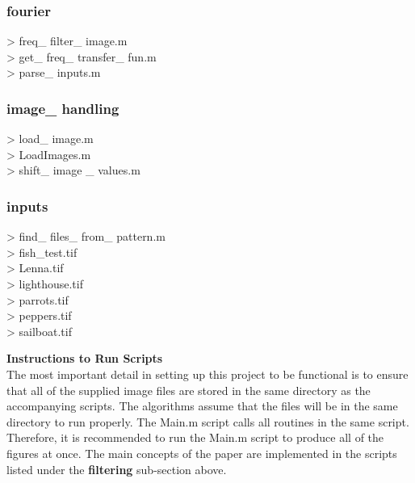 \documentclass[./rarnold_final_project.tex]{subfiles}
\begin{document}
\subsubsection*{fourier}
> freq\_ filter\_ image.m \\
\indent > get\_ freq\_ transfer\_ fun.m \\
\indent > parse\_ inputs.m

\subsubsection*{image\_ handling}
> load\_ image.m \\
\indent > LoadImages.m \\
\indent > shift\_ image \_ values.m

\subsubsection*{inputs}
> find\_ files\_ from\_ pattern.m \\ 
\indent > fish_test.tif \\
\indent > Lenna.tif \\
\indent > lighthouse.tif \\
\indent > parrots.tif \\
\indent > peppers.tif \\
\indent > sailboat.tif

\clearpage

\noindent \textbf{Instructions to Run Scripts} \\

\noindent The most important detail in setting up this project to be functional is to ensure that all of the supplied image files are stored in the same directory as the accompanying scripts.  The algorithms assume that the files will be in the same directory to run properly.  The Main.m script calls all routines in the same script.  Therefore, it is recommended to run the Main.m script to produce all of the figures at once.  The main concepts of the paper are implemented in the scripts listed under the \textbf{filtering} sub-section above.
\end{document}
